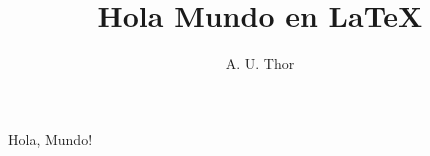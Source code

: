\documentclass {article}
\title{Hola Mundo en LaTeX}
\author{ A. U. Thor }
\begin{document}
\maketitle 
Hola, Mundo!
\end{document}
